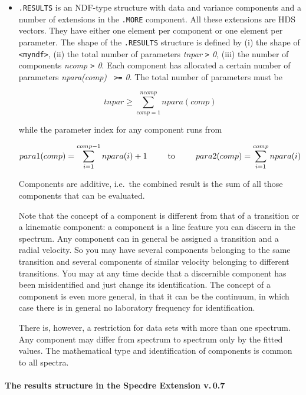 \begin{itemize}
\item{\tt .RESULTS} is an NDF-type structure with data and variance
   components and a number of extensions in the {\tt .MORE}
   component. All these extensions are HDS vectors. They have either one
   element per component or one element per parameter. The shape of the
   {\tt .RESULTS} structure is defined by (i) the shape of {\tt
   <myndf>}, (ii) the total number of parameters {\it tnpar {\tt>} 0},
   (iii) the number of components {\it ncomp {\tt>} 0}. Each component
   has allocated a certain number of parameters {\it npara(comp) {\tt
   >=} 0}. The total number of parameters must be

   \[tnpar\geq\sum_{comp=1}^{ncomp}npara(comp)\]

   while the parameter index for any component runs from

   \[para1(comp)=\sum_{i=1}^{comp-1}npara(i)+1
   \mbox{\phantom{mmm}to\phantom{mmm}}
   para2(comp)=\sum_{i=1}^{comp}npara(i)\]

   Components are additive, i.e.\ the combined result is the sum of all
   those components that can be evaluated.

   Note that the concept of a component is different from that of a
   transition or a kinematic component: a component is a line feature
   you can discern in the spectrum. Any component can in general be
   assigned a transition and a radial velocity. So you may have several
   components belonging to the same transition and several components of
   similar velocity belonging to different transitions. You may at any
   time decide that a discernible component has been misidentified and
   just change its identification. The concept of a component is even
   more general, in that it can be the continuum, in which case there is
   in general no laboratory frequency for identification.

   There is, however, a restriction for data sets with more than one
   spectrum. Any component may differ from spectrum to spectrum only by
   the fitted values. The mathematical type and identification of
   components is common to all spectra.

\end{itemize}


\paragraph{The results structure in the Specdre Extension v.\,0.7}

